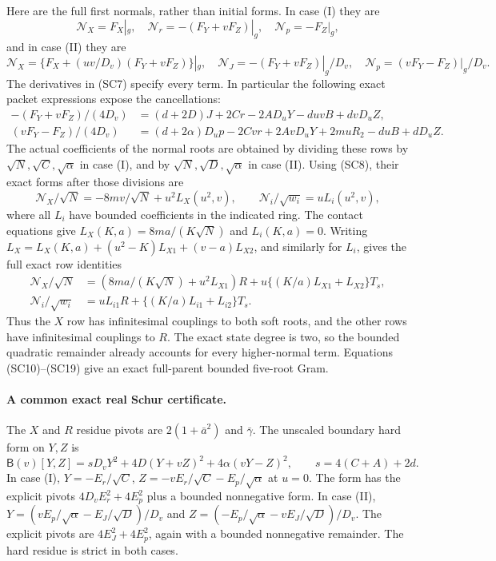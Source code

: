 Here are the full first normals, rather than initial forms. In
case (I) they are
\[
 \mathcal N_X=F_X|_g,\quad
 \mathcal N_r=-(F_Y+vF_Z)|_g,\quad
 \mathcal N_p=-F_Z|_g,                              \tag{SC15}
\]
and in case (II) they are
\[
 \mathcal N_X=\{F_X+(uv/D_v)(F_Y+vF_Z)\}|_g,\quad
 \mathcal N_J=-(F_Y+vF_Z)|_g/D_v,\quad
 \mathcal N_p=(vF_Y-F_Z)|_g/D_v.                     \tag{SC16}
\]
The derivatives in (SC7) specify every term. In particular the
following exact packet expressions expose the cancellations:
\[
\begin{split}
 -(F_Y+vF_Z)/(4D_v)
   &=(d+2D)J+2Cr-2AD_uY-duvB+dvD_uZ,\\
 (vF_Y-F_Z)/(4D_v)
   &=(d+2\alpha)D_up-2Cvr+2AvD_uY+2muR_2-duB+dD_uZ.
\end{split}\tag{SC17}
\]
The actual coefficients of the normal roots are obtained by dividing
these rows by $\sqrt N,\sqrt C,\sqrt\alpha$ in case (I), and by
$\sqrt N,\sqrt D,\sqrt\alpha$ in case (II).
Using (SC8), their exact forms after those divisions are
\[
 \mathcal N_X/\sqrt N=-8mv/\sqrt N+u^2L_X(u^2,v),
 \qquad \mathcal N_i/\sqrt{w_i}=uL_i(u^2,v),          \tag{SC18}
\]
where all $L_i$ have bounded coefficients in the indicated ring.
The contact equations give
$L_X(K,a)=8ma/(K\sqrt N)$ and $L_i(K,a)=0$.
Writing $L_X=L_X(K,a)+(u^2-K)L_{X1}+(v-a)L_{X2}$, and similarly
for $L_i$, gives the full exact row identities
\[
\begin{split}
 \mathcal N_X/\sqrt N
  &=(8ma/(K\sqrt N)+u^2L_{X1})R
       +u\{(K/a)L_{X1}+L_{X2}\}T_s,\\
 \mathcal N_i/\sqrt{w_i}
  &=uL_{i1}R+\{(K/a)L_{i1}+L_{i2}\}T_s.             
\end{split}\tag{SC19}
\]
Thus the $X$ row has infinitesimal couplings to both soft roots,
and the other rows have infinitesimal couplings to $R$.
The exact state degree is two, so the bounded quadratic remainder
already accounts for every higher-normal term. Equations
(SC10)--(SC19) give an exact full-parent bounded five-root Gram.

\paragraph{A common exact real Schur certificate.}
The $X$ and $R$ residue pivots are $2(1+\bar a^2)$ and
$\bar\gamma$. The unscaled boundary hard form on $Y,Z$ is
\[
 \mathsf B(v)[Y,Z]
 =sD_vY^2+4D(Y+vZ)^2+4\alpha(vY-Z)^2,
 \qquad s=4(C+A)+2d.                               \tag{SC20}
\]
In case (I), $Y=-E_r/\sqrt C$,
$Z=-vE_r/\sqrt C-E_p/\sqrt\alpha$ at $u=0$.
The form has the explicit pivots $4D_vE_r^2+4E_p^2$ plus a
bounded nonnegative form. In case (II),
$Y=(vE_p/\sqrt\alpha-E_J/\sqrt D)/D_v$ and
$Z=(-E_p/\sqrt\alpha-vE_J/\sqrt D)/D_v$.
The explicit pivots are $4E_J^2+4E_p^2$, again with a bounded
nonnegative remainder. The hard residue is strict in both cases.

